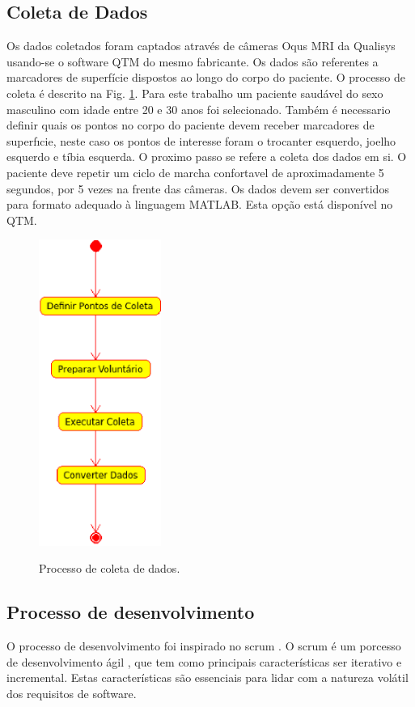 \documentclass[journal]{IEEEtran}
\begin{document}
\subsection{Coleta de Dados}
Os dados coletados foram captados através de câmeras Oqus MRI da
Qualisys usando-se o software QTM do mesmo fabricante. 
Os dados são referentes a marcadores de superfície
dispostos ao longo do corpo do paciente.
O processo de coleta é descrito na Fig. \ref{coleta_dados}.
Para este trabalho um paciente saudável do sexo masculino com idade entre 20 e 30 anos
foi selecionado.
Também é necessario definir quais os pontos no corpo do paciente devem
receber marcadores de superfıcie, neste caso os pontos de interesse foram o trocanter esquerdo, joelho esquerdo e tíbia esquerda. 
O proximo passo se refere a coleta dos dados em si. 
O paciente deve repetir um ciclo de marcha confortavel de aproximadamente 5 segundos,
por 5 vezes na frente das câmeras.
Os dados devem ser convertidos para formato adequado à linguagem
MATLAB. Esta opção está disponível no QTM. 
\begin{figure}[!t]
	\centering
	{\includegraphics[width=4cm]{coleta_dados}}
	\caption{Processo de coleta de dados.}
	\label{coleta_dados}
\end{figure}

\subsection{Processo de desenvolvimento}
O processo de desenvolvimento foi inspirado no scrum \cite{Schwaber2001}.
O scrum é um porcesso de desenvolvimento ágil \cite{Beck2001}, que tem como
principais características ser iterativo e incremental. Estas características
são essenciais para lidar com a natureza volátil dos requisitos de software.
\end{document}
